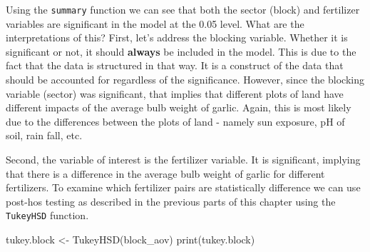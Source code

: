\documentclass[
  letterpaper,
  DIV=11,
  numbers=noendperiod]{scrreprt}
\newenvironment{Shaded}{\begin{snugshade}}{\end{snugshade}}
\newcommand{\FunctionTok}[1]{\textcolor[rgb]{0.28,0.35,0.67}{#1}}
\newcommand{\NormalTok}[1]{\textcolor[rgb]{0.00,0.23,0.31}{#1}}
\newcommand{\OtherTok}[1]{\textcolor[rgb]{0.00,0.23,0.31}{#1}}
\begin{document}
Using the \texttt{summary} function we can see that both the sector
(block) and fertilizer variables are significant in the model at the
0.05 level. What are the interpretations of this? First, let's address
the blocking variable. Whether it is significant or not, it should
\textbf{always} be included in the model. This is due to the fact that
the data is structured in that way. It is a construct of the data that
should be accounted for regardless of the significance. However, since
the blocking variable (sector) was significant, that implies that
different plots of land have different impacts of the average bulb
weight of garlic. Again, this is most likely due to the differences
between the plots of land - namely sun exposure, pH of soil, rain fall,
etc.

Second, the variable of interest is the fertilizer variable. It is
significant, implying that there is a difference in the average bulb
weight of garlic for different fertilizers. To examine which fertilizer
pairs are statistically difference we can use post-hos testing as
described in the previous parts of this chapter using the
\texttt{TukeyHSD} function.

\begin{Shaded}
\begin{Highlighting}[]
\NormalTok{tukey.block }\OtherTok{\textless{}{-}} \FunctionTok{TukeyHSD}\NormalTok{(block\_aov)}
\FunctionTok{print}\NormalTok{(tukey.block)}
\end{Highlighting}
\end{Shaded}
\end{document}
